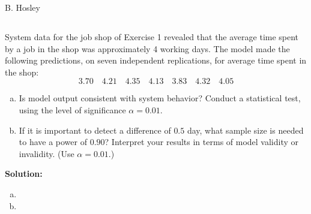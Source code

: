 \documentclass[12pt]{amsart}
\begin{document}
\raggedbottom

\hspace{\fill} {\large B. Hosley}
\bigskip


\setcounter{section}{10}
\setcounter{subsection}{1}
\subsection{}
System data for the job shop of Exercise 1 revealed that the average time spent by a job in the
shop was approximately 4 working days. The model made the following predictions, on seven
independent replications, for average time spent in the shop:
\[3.70\quad 4.21\quad 4.35\quad 4.13\quad 3.83\quad 4.32\quad 4.05\]
\begin{enumerate}[(a)]
	\item Is model output consistent with system behavior? Conduct a statistical test, using the level of
	significance \(\alpha = 0.01\).
	\item If it is important to detect a difference of \(0.5\) day, what sample size is needed to have a power
	of \(0.90\)? Interpret your results in terms of model validity or invalidity. (Use \(\alpha = 0.01\).)
\end{enumerate}

\bigskip
\textbf{Solution:}

\begin{enumerate}[(a)]
	\item 
	\item 
\end{enumerate}
	
	
\end{document}
